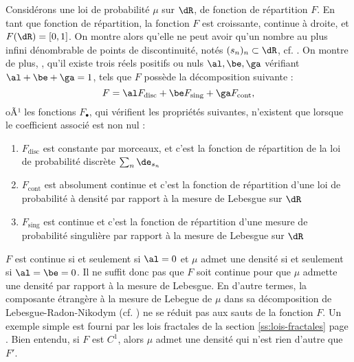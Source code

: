 {{\begin{remark}
  Considérons une loi de probabilité $\mu$ sur $\dR$, de fonction de
  répartition $F$. En tant que fonction de répartition, la fonction $F$ est
  croissante, continue à droite, et $F(\dR)=[0,1]$. On montre alors qu'elle ne
  peut avoir qu'un nombre au plus infini dénombrable de points de discontinuité, notés
  $(s_n)_n\subset\dR$, cf.  \cite[prop. III.2.2 page
  48]{barbe-ledoux}. On montre de plus, \cite[III, pages 49-50]{barbe-ledoux},
  qu'il existe trois réels positifs ou nuls $\al, \be, \ga$ vérifiant
  $\al+\be+\ga=1$, tels que $F$ possède la décomposition suivante :
  $$
  F=\al F_{\text{disc}} + \be F_{\text{sing}} + \ga F_{\text{cont}},
  $$
  oÃ¹ les fonctions $F_\bullet$, qui vérifient les propriétés suivantes,
  n'existent que lorsque le coefficient associé est non nul :
  \begin{enumerate}
  \item $F_{\text{disc}}$ est constante par morceaux, et c'est la fonction de
    répartition de la loi de probabilité discrète
    $\sum_n\de_{s_n}$
  \item $F_{\text{cont}}$ est absolument continue et c'est la fonction de
    répartition d'une loi de probabilité à densité par rapport à la mesure de
    Lebesgue sur $\dR$
  \item $F_{\text{sing}}$ est continue et c'est la fonction de répartition
    d'une mesure de probabilité singulière par rapport à la mesure de Lebesgue
    sur $\dR$
  \end{enumerate}
  $F$ est continue si et seulement si $\al=0$ et $\mu$ admet une densité si et
  seulement si $\al=\be=0$.  Il ne suffit donc pas que $F$ soit continue pour
  que $\mu$ admette une densité par rapport à la mesure de Lebesgue. En
  d'autre termes, la composante étrangère à la mesure de Lebegue de $\mu$ dans
  sa décomposition de Lebesgue-Radon-Nikodym (cf. \cite[thm 6.9, page
  117]{rudin}) ne se réduit pas aux sauts de la fonction $F$. Un exemple
  simple est fourni par les lois fractales de la section
  \ref{ss:lois-fractales} page \pageref{ss:lois-fractales}.  Bien entendu, si
  $F$ est $C^1$, alors $\mu$ admet une densité qui n'est rien d'autre que
  $F'$.
\end{remark}

}}

